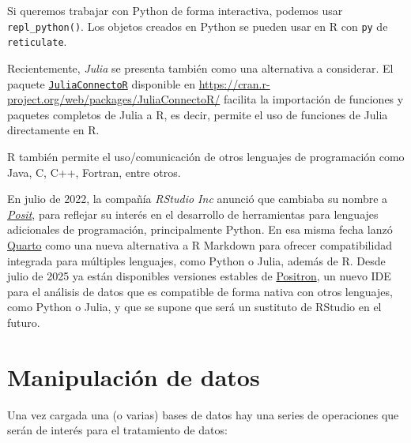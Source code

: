 \documentclass[
]{book}
\theoremstyle{break}
\theoremstyle{nonumberplain}
\begin{document}
Si queremos trabajar con Python de forma interactiva, podemos usar \texttt{repl\_python()}. Los objetos creados en Python se pueden usar en R con \texttt{py} de \texttt{reticulate}.

Recientemente, \emph{Julia} se presenta también como una alternativa a considerar.
El paquete \href{https://github.com/stefan-m-lenz/JuliaConnectoR}{\texttt{JuliaConnectoR}} disponible en \url{https://cran.r-project.org/web/packages/JuliaConnectoR/} facilita la importación de funciones y paquetes completos de Julia a R, es decir, permite el uso de funciones de Julia directamente en R.

R también permite el uso/comunicación de otros lenguajes de programación como Java, C, C++, Fortran, entre otros.

En julio de 2022, la compañía \emph{RStudio Inc} anunció que cambiaba su nombre a \href{https://posit.co}{\emph{Posit}}, para reflejar su interés en el desarrollo de herramientas para lenguajes adicionales de programación, principalmente Python.
En esa misma fecha lanzó \href{https://quarto.org}{Quarto} como una nueva alternativa a R Markdown para ofrecer compatibilidad integrada para múltiples lenguajes, como Python o Julia, además de R.
Desde julio de 2025 ya están disponibles versiones estables de \href{https://positron.posit.co/}{Positron}, un nuevo IDE para el análisis de datos que es compatible de forma nativa con otros lenguajes, como Python o Julia, y que se supone que será un sustituto de RStudio en el futuro.

\section{Manipulación de datos}\label{manip}

Una vez cargada una (o varias) bases de datos hay una series de operaciones que serán de interés para el tratamiento de datos:
\end{document}
